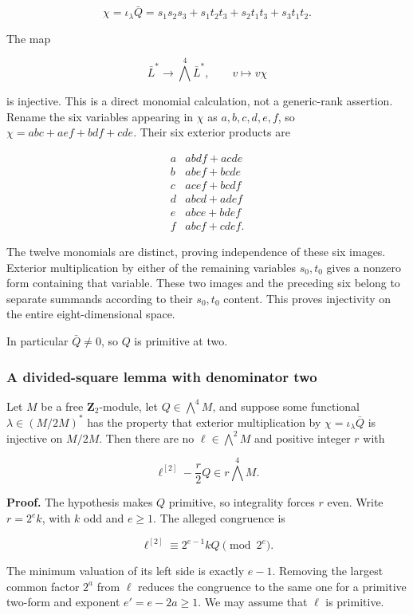 \[
 \chi=\iota_\lambda\bar Q
 =s_1s_2s_3+s_1t_2t_3+s_2t_1t_3+s_3t_1t_2.
 \tag{E808.4}
\]

The map

\[
 \bar L^*\longrightarrow\bigwedge^4\bar L^*,\qquad
 v\longmapsto v\chi
 \tag{E808.5}
\]

is injective. This is a direct monomial calculation, not a generic-rank
assertion. Rename the six variables appearing in \(\chi\) as
\(a,b,c,d,e,f\), so \(\chi=abc+aef+bdf+cde\). Their six exterior
products are

\[
 \begin{array}{c|l}
 a&abdf+acde\\
 b&abef+bcde\\
 c&acef+bcdf\\
 d&abcd+adef\\
 e&abce+bdef\\
 f&abcf+cdef .
 \end{array}
\]

The twelve monomials are distinct, proving independence of these six
images. Exterior multiplication by either of the remaining variables
\(s_0,t_0\) gives a nonzero form containing that variable. These two
images and the preceding six belong to separate summands according to
their \(s_0,t_0\) content. This proves injectivity on the entire
eight-dimensional space.

In particular \(\bar Q\ne0\), so \(Q\) is primitive at two.

\subsubsection{A divided-square lemma with denominator
two}\label{a-divided-square-lemma-with-denominator-two}

Let \(M\) be a free \(\mathbf Z_2\)-module, let \(Q\in\bigwedge^4M\),
and suppose some functional \(\lambda\in(M/2M)^*\) has the property that
exterior multiplication by \(\chi=\iota_\lambda\bar Q\) is injective on
\(M/2M\). Then there are no \(\ell\in\bigwedge^2M\) and positive integer
\(r\) with

\[
 \ell^{[2]}-\frac r2Q\in r\bigwedge^4M.
 \tag{E808.6}
\]

\textbf{Proof.} The hypothesis makes \(Q\) primitive, so integrality
forces \(r\) even. Write \(r=2^e k\), with \(k\) odd and \(e\ge1\). The
alleged congruence is

\[
 \ell^{[2]}\equiv 2^{e-1}kQ\pmod{2^e}.
 \tag{E808.7}
\]

The minimum valuation of its left side is exactly \(e-1\). Removing the
largest common factor \(2^a\) from \(\ell\) reduces the congruence to
the same one for a primitive two-form and exponent \(e'=e-2a\ge1\). We
may assume that \(\ell\) is primitive.


